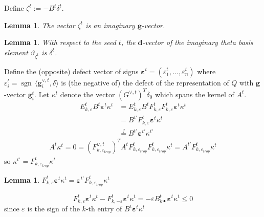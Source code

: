 \documentclass{amsart}
\newtheorem{lemma}[theorem]{Lemma}
\numberwithin{theorem}{section}
\newcommand{\bfd}{\boldsymbol{d}}
\newcommand{\bfg}{\boldsymbol{g}}
\newcommand{\sgn}{{\operatorname{sgn}}}
\begin{document}
  Define $\zeta^t := -B^t \delta^t$.
  \begin{lemma}
    The vector $\zeta^t$ is an imaginary $\bfg$-vector.
  \end{lemma}

  \begin{lemma}
    With respect to the seed $t$, the $\bfd$-vector of the imaginary theta basis element $\vartheta_{\zeta^t}$ is $\delta^t$. 
  \end{lemma}

  Define the (opposite) defect vector of signs $\boldsymbol{\varepsilon}^t=(\varepsilon^t_1,\ldots,\varepsilon^t_n)$ where $\varepsilon^t_i=\sgn\,\langle \bfg^{\vee,t}_i,\delta\rangle$ is (the negative of) the defect of the representation of $Q$ with $\bfg$-vector $\bfg^t_i$.
  Let $\kappa^t$ denote the vector $(G^{\vee,t})^T\delta_0$ which spans the kernel of $A^t$.
  \begin{align*}
    E_{k,\varepsilon}^t B^t \boldsymbol{\varepsilon}^t \kappa^t
    &=
    E_{k,\varepsilon}^t B^t F^t_{k,\varepsilon} F^t_{k,\varepsilon} \boldsymbol{\varepsilon}^t \kappa^t\\
    &=
    B^{t'} F^t_{k,\varepsilon} \boldsymbol{\varepsilon}^t \kappa^t\\
    &\stackrel{?}{=} B^{t'} \boldsymbol{\varepsilon}^{t'} \kappa^{t'}
  \end{align*}
  \begin{align*}
    A^t\kappa^t=0=(F^{\vee,t}_{k,\varepsilon_{trop}})^T A^t F^t_{k,\varepsilon_{trop}} F^t_{k,\varepsilon_{trop}} \kappa^t=A^{t'} F^t_{k,\varepsilon_{trop}} \kappa^t
  \end{align*}
  so $\kappa^{t'}=F^t_{k,\varepsilon_{trop}} \kappa^t$

  \begin{lemma}
    $F^t_{k,\varepsilon} \boldsymbol{\varepsilon}^t \kappa^t = \boldsymbol{\varepsilon}^{t'} F^t_{k,\varepsilon_{trop}} \kappa^t$
  \end{lemma}
  \[F^t_{k,\varepsilon} \boldsymbol{\varepsilon}^t \kappa^t - F^t_{k,-\varepsilon} \boldsymbol{\varepsilon}^t \kappa^t=-\varepsilon B^t_{k\bullet} \boldsymbol{\varepsilon}^t \kappa^t \le 0\]
  since $\varepsilon$ is the sign of the $k$-th entry of $B^t \boldsymbol{\varepsilon}^t \kappa^t$





  
\end{document}

